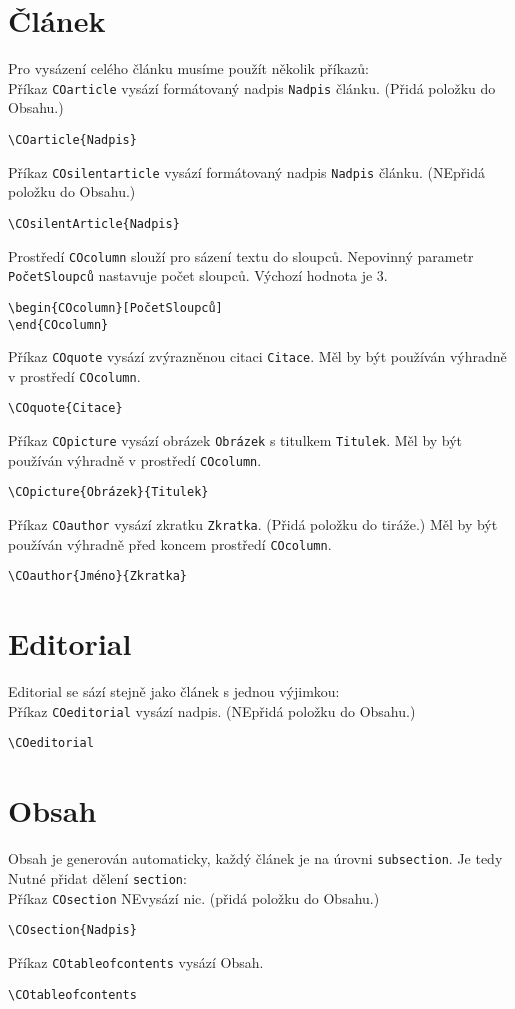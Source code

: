 \documentclass{article}
\begin{document}
\section{Článek}%
Pro vysázení celého článku musíme použít několik příkazů:\\[0.3cm]
Příkaz \texttt{COarticle} vysází formátovaný nadpis \texttt{Nadpis} článku. (Přidá položku do Obsahu.)
\begin{verbatim}
\COarticle{Nadpis}
\end{verbatim}
Příkaz \texttt{COsilentarticle} vysází formátovaný nadpis \texttt{Nadpis} článku. (NEpřidá položku do Obsahu.)
\begin{verbatim}
\COsilentArticle{Nadpis}
\end{verbatim}
Prostředí \texttt{COcolumn} slouží pro sázení textu do sloupců. Nepovinný parametr \texttt{PočetSloupců} nastavuje počet sloupců. Výchozí hodnota je $3$.
\begin{verbatim}
\begin{COcolumn}[PočetSloupců]
\end{COcolumn}
\end{verbatim}
Příkaz \texttt{COquote} vysází zvýrazněnou citaci \texttt{Citace}. Měl by být používán výhradně v prostředí \texttt{COcolumn}.
\begin{verbatim}
\COquote{Citace}
\end{verbatim}
Příkaz \texttt{COpicture} vysází obrázek \texttt{Obrázek} s titulkem \texttt{Titulek}. Měl by být používán výhradně v prostředí \texttt{COcolumn}.
\begin{verbatim}
\COpicture{Obrázek}{Titulek}
\end{verbatim}
Příkaz \texttt{COauthor} vysází zkratku \texttt{Zkratka}. (Přidá položku do tiráže.) Měl by být používán výhradně před koncem prostředí \texttt{COcolumn}.
\begin{verbatim}
\COauthor{Jméno}{Zkratka}
\end{verbatim}
%
\section{Editorial}%
Editorial se sází stejně jako článek s jednou výjimkou:\\[0.3cm]
Příkaz \texttt{COeditorial} vysází nadpis. (NEpřidá položku do Obsahu.)
\begin{verbatim}
\COeditorial
\end{verbatim}
%
\section{Obsah}%
Obsah je generován automaticky, každý článek je na úrovni \texttt{subsection}. Je tedy Nutné přidat dělení \texttt{section}:\\[0.3cm]
Příkaz \texttt{COsection} NEvysází nic. (přidá položku do Obsahu.)
\begin{verbatim}
\COsection{Nadpis}
\end{verbatim}
Příkaz \texttt{COtableofcontents} vysází Obsah.
\begin{verbatim}
\COtableofcontents
\end{verbatim}
%
\end{document}
